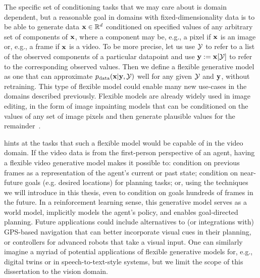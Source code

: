 The specific set of conditioning tasks that we may care about is domain dependent, but a reasonable goal in domains with fixed-dimensionality data is to be able to generate data ${\mathbf{x}} \in \mathbb{R}^d$ conditioned on specified values of any arbitrary set of components of ${\mathbf{x}}$, where a component may be, e.g., a pixel if ${\mathbf{x}}$ is an image or, e.g., a frame if ${\mathbf{x}}$ is a video. To be more precise,
let us use ${\mathcal{Y}}$ to refer to a list of the observed components of a particular datapoint and use ${\mathbf{y}} := {\mathbf{x}}[{\mathcal{Y}}]$ to refer to the corresponding observed values. Then we define a flexible generative model as one that can approximate $p_{\rm{data}}({\mathbf{x}}|{\mathbf{y}},{\mathcal{Y}})$ well for any given ${\mathcal{Y}}$ and ${\mathbf{y}}$, without retraining.
This type of flexible model could enable many new use-cases in the domains described previously. Flexible models are already widely used in image editing, in the form of image inpainting models that can be conditioned on the values of any set of image pixels and then generate plausible values for the remainder~\citep{rombach2022high,zhao2021large,harvey2021conditional}.

 hints at the tasks that such a flexible model would be capable of in the video domain. If the video data is from the first-person perspective of an agent, having a flexible video generative model makes it possible to: condition on previous frames as a representation of the agent's current or past state; condition on near-future goals (e.g. desired locations) for planning tasks; or, using the techniques we will introduce in this thesis, even to condition on goals hundreds of frames in the future. In a reinforcement learning sense, this generative model serves as a world model, implicitly models the agent's policy, and enables goal-directed planning. Future applications could include alternatives to (or integrations with) GPS-based navigation that can better incorporate visual cues in their planning, or controllers for advanced robots that take a visual input. One can similarly imagine a myriad of potential applications of flexible generative models for, e.g., digital twins or in speech-to-text-style systems, but we limit the scope of this dissertation to the vision domain.


